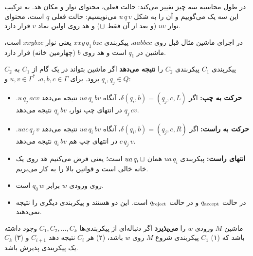 \begin{definition}[پیکربندی]
در طول محاسبه سه چیز تغییر می‌کند: حالت فعلی، محتوای نوار و مکان هد. به ترکیب این سه یک  می‌گوییم و آن را به شکل $u\,q\,v$ می‌نویسیم: حالت فعلی $q$ است، محتوای نوار $uv$ (و بعد از آن فقط $\sqcup$) و هد روی اولین نماد $v$ قرار دارد.
\end{definition}

\begin{example}
در اجرای ماشین مثال قبل روی $aabbcc$، پیکربندی $xxy\,q_1\,bzc$ یعنی نوار $xxybzc$ است، ماشین در $q_1$ است و هد روی $b$ (چهارمین خانه) قرار دارد.
\end{example}

\begin{definition}
پیکربندی $C_1$ پیکربندی $C_2$ را \textbf{نتیجه می‌دهد} اگر ماشین بتواند در یک گام از $C_1$ به $C_2$ برود. برای $a,b,c\in\Gamma$، $u,v\in\Gamma^*$ و $q_i,q_j\in Q$:
\begin{itemize}
\item \textbf{حرکت به چپ:} اگر $\delta(q_i,b)=(q_j,c,L)$، آنگاه $ua\,q_i\,bv$ نتیجه می‌دهد $u\,q_j\,acv$. در انتهای چپ نوار، $q_i\,bv$ نتیجه می‌دهد $q_j\,cv$.
\item \textbf{حرکت به راست:} اگر $\delta(q_i,b)=(q_j,c,R)$، آنگاه $ua\,q_i\,bv$ نتیجه می‌دهد $uac\,q_j\,v$. در انتهای چپ هم $q_i\,bv$ نتیجه می‌دهد $c\,q_j\,v$.
\item \textbf{انتهای راست:} پیکربندی $ua\,q_i$ همان $ua\,q_i\,\sqcup$ است؛ یعنی فرض می‌کنیم هد روی یک خانه خالی است و قوانین بالا را به کار می‌بریم.
\end{itemize}
\end{definition}

\begin{definition}[پذیرش]
\begin{itemize}
\item {} روی ورودی $w$ برابر $q_0\,w$ است.
\item در  حالت $q_{\mathrm{accept}}$ و در  حالت $q_{\mathrm{reject}}$ است. این دو  هستند و پیکربندی دیگری را نتیجه نمی‌دهند.
\end{itemize}
ماشین $M$ ورودی $w$ را \textbf{می‌پذیرد} اگر دنباله‌ای از پیکربندی‌ها $C_1,C_2,\dots,C_k$ وجود داشته باشد که (۱) $C_1$ پیکربندی شروع $M$ روی $w$ باشد، (۲) هر $C_i$ نتیجه دهد $C_{i+1}$ و (۳) $C_k$ یک پیکربندی پذیرش باشد.
\end{definition}

